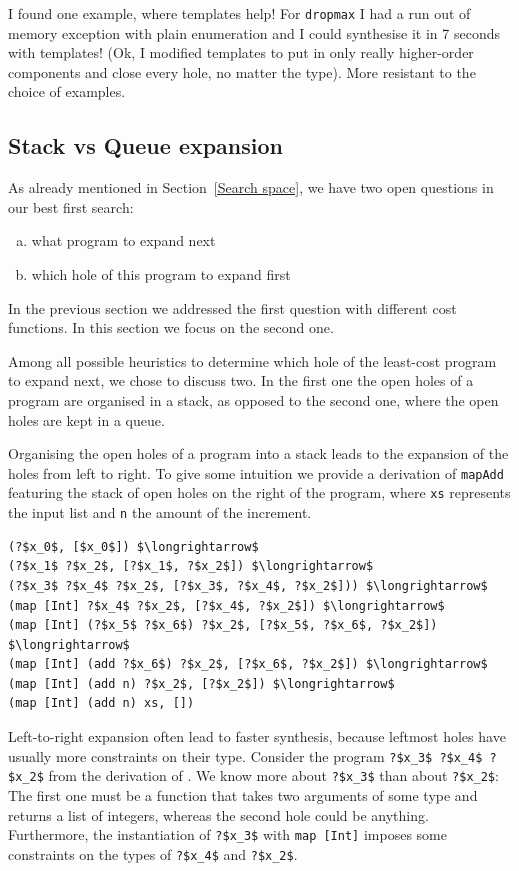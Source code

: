 I found one example, where templates help! For \lstinline?dropmax? I had a run out of memory exception with plain enumeration and I could synthesise it in 7 seconds with templates!
(Ok, I modified templates to put in only really higher-order components and close every hole, no matter the type). More resistant to the choice of examples.

\subsection{Stack vs Queue expansion}
As already mentioned in Section~\ref{Search space}, we have two open questions in our best first search:
\begin{enumerate}[a.]
\item what program to expand next
\item which hole of this program to expand first
\end{enumerate}
In the previous section we addressed the first question with different cost functions. In this section we focus on the second one.

Among all possible heuristics to determine which hole of the least-cost program to expand next, we chose to discuss two. In the first one the open holes of a program are organised in a stack, as opposed to the second one, where the open holes are kept in a queue.

Organising the open holes of a program into a stack leads to the expansion of the holes from left to right. To give some intuition we provide a derivation of \lstinline?mapAdd? featuring the stack of open holes on the right of the program, where \lstinline?xs? represents the input list and \lstinline?n? the amount of the increment.
\begin{lstlisting}[style=plain]
(?$x_0$, [$x_0$]) $\longrightarrow$
(?$x_1$ ?$x_2$, [?$x_1$, ?$x_2$]) $\longrightarrow$
(?$x_3$ ?$x_4$ ?$x_2$, [?$x_3$, ?$x_4$, ?$x_2$])) $\longrightarrow$
(map [Int] ?$x_4$ ?$x_2$, [?$x_4$, ?$x_2$]) $\longrightarrow$
(map [Int] (?$x_5$ ?$x_6$) ?$x_2$, [?$x_5$, ?$x_6$, ?$x_2$]) $\longrightarrow$
(map [Int] (add ?$x_6$) ?$x_2$, [?$x_6$, ?$x_2$]) $\longrightarrow$
(map [Int] (add n) ?$x_2$, [?$x_2$]) $\longrightarrow$
(map [Int] (add n) xs, [])
\end{lstlisting}
Left-to-right expansion often lead to faster synthesis, because leftmost holes have usually more constraints on their type. Consider the program \lstinline!?$x_3$ ?$x_4$ ?$x_2$! from the derivation of \lstinline??. We know more about \lstinline!?$x_3$! than about \lstinline!?$x_2$!: The first one must be a function that takes two arguments of some type and returns a list of integers, whereas the second hole could be anything. Furthermore, the instantiation of \lstinline!?$x_3$! with \lstinline?map [Int]? imposes some constraints on the types of \lstinline!?$x_4$! and \lstinline!?$x_2$!.

